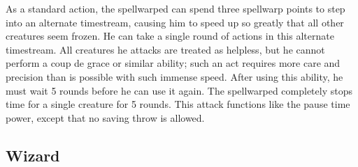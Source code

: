  As a standard action, the spellwarped can spend three spellwarp points to step into an alternate timestream, causing him to speed up so greatly that all other creatures seem frozen. He can take a single round of actions in this alternate timestream. All creatures he attacks are treated as helpless, but he cannot perform a coup de grace or similar ability; such an act requires more care and precision than is possible with such immense speed. After using this ability, he must wait 5 rounds before he can use it again.
 The spellwarped completely stops time for a single creature for 5 rounds. This attack functions like the pause time power, except that no saving throw is allowed.

\subsection{Wizard}
